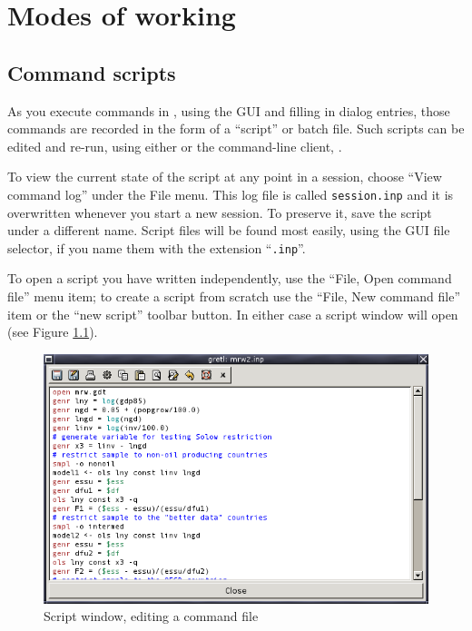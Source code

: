 \chapter{Modes of working}
\label{modes}

\section{Command scripts}
\label{scripts}

As you execute commands in , using the GUI and filling in
dialog entries, those commands are recorded in the form of a
``script'' or batch file.  Such scripts can be edited and re-run,
using either  or the command-line client, .

To view the current state of the script at any point in a 
session, choose ``View command log'' under the File menu. This log
file is called \verb+session.inp+ and it is overwritten whenever you
start a new session.  To preserve it, save the script under a
different name.  Script files will be found most easily, using the GUI
file selector, if you name them with the extension ``\verb+.inp+''.

To open a script you have written independently, use the ``File, Open
command file'' menu item; to create a script from scratch use the
``File, New command file'' item or the ``new script'' toolbar button.
In either case a script window will open (see Figure
\ref{fig-scriptwin}).

\begin{figure}[htbp]
  \begin{center}
    \includegraphics[scale=0.5]{figures/scriptwin}
  \end{center}
  \caption{Script window, editing a command file}
  \label{fig-scriptwin}
\end{figure}

